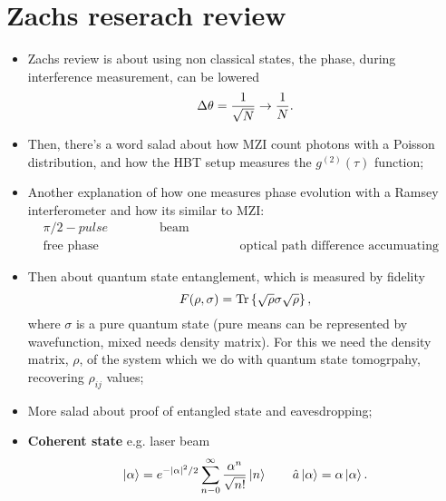 
\section{Zachs reserach review}
\begin{itemize}
\item  Zachs review  is  about using  non  classical states,  the  phase, during  interference
  measurement, can be lowered
  \[
    \Delta\theta = \frac{1}{\sqrt{N}} \rightarrow \frac{1}{N}.
  \]
\item Then, there's a word salad about how  MZI count photons with a Poisson distribution, and
  how the HBT setup measures the $ g^{(2)}(\tau) $ function;
\item Another explanation of how one measures phase evolution with a Ramsey interferometer and
  how its similar to MZI:
  \[
    \begin{aligned}
      & \pi/2-pulse &\text{beam splitter}\\
      &\text{free phase evolution} & &\text{optical path difference accumuating phase}
    \end{aligned}
  \]
\item Then about quantum state entanglement, which is measured by fidelity
  \begin{equation}\label{key}
    F(\rho,\sigma) = \text{Tr}\left\lbrace\sqrt{\rho}\sigma\sqrt{\rho}\right\rbrace,
  \end{equation}
  \noindent  where  $  \sigma $  is  a  pure  quantum  state  (pure  means can  be  represented  by
  wavefunction, mixed needs  density matrix). For this we  need the density matrix, $  \rho $, of
  the system which we do with quantum state tomogrpahy, recovering $ \rho_{ij} $ values;
\item More salad about proof of entangled state and eavesdropping;
\item \textbf{Coherent state} e.g. laser beam
  \begin{equation}\label{key}
    \ket{\alpha} = e^{-\left|\alpha\right|^2/2}\sum_{n-0}^{\infty}\frac{\alpha^n}{\sqrt{n!}}\ket{n}\qquad \hat{a}\ket{\alpha} = \alpha\ket{\alpha}.
  \end{equation}
 		

\end{itemize}
